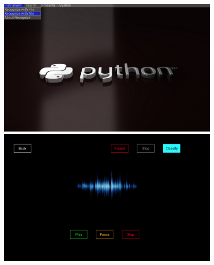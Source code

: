 \documentclass[whitelogo,12pt]{tudelft-report}
\begin{document}
\begin{figure}[!htb]
  \includegraphics[width=\linewidth]{im1}
\endminipage\hfill
{}
  \includegraphics[width=\linewidth]{im2}
\endminipage\hfill\\


\end{figure}
\end{document}
